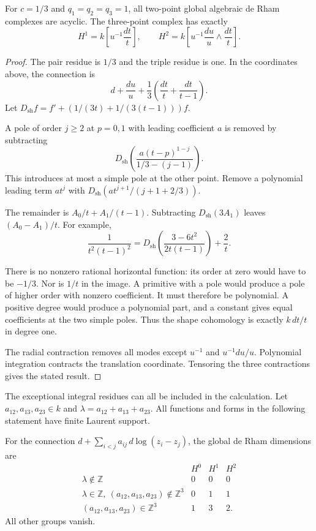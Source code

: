 \begin{proposition}\label{v4-arith:centers:prop:thirds}
For $c=1/3$ and $q_1=q_2=q_3=1$, all two-point
global algebraic de Rham complexes are acyclic.
The three-point complex has exactly
\[
 H^1=k\left[u^{-1}\frac{dt}{t}\right],\qquad
 H^2=k\left[u^{-1}\frac{du}{u}\wedge\frac{dt}{t}\right].
\]
\end{proposition}

\begin{proof}
The pair residue is $1/3$ and the triple residue
is one. In the coordinates above, the connection
is
\[
 d+\frac{du}{u}
 +\frac13\left(\frac{dt}{t}+\frac{dt}{t-1}\right).
\]
Let
$D_{\mathrm{sh}}f=f'+(1/(3t)+1/(3(t-1)))f$.

A pole of order $j\geq2$ at $p=0,1$ with
leading coefficient $a$ is removed by
subtracting
\[
 D_{\mathrm{sh}}\left(
 \frac{a(t-p)^{1-j}}{1/3-(j-1)}\right).
\]
This introduces at most a simple pole at the
other point. Remove a polynomial leading
term $at^j$ with
$D_{\mathrm{sh}}(at^{j+1}/(j+1+2/3))$.

The remainder is $A_0/t+A_1/(t-1)$.
Subtracting $D_{\mathrm{sh}}(3A_1)$ leaves
$(A_0-A_1)/t$. For example,
\begin{equation}\label{v4-arith:centers:eq:shape-identity}
 \frac1{t^2(t-1)^2}
 =
 D_{\mathrm{sh}}\left(\frac{3-6t^2}{2t(t-1)}\right)
 +\frac2t.
\end{equation}

There is no nonzero rational horizontal function:
its order at zero would have to be $-1/3$.
Nor is $1/t$ in the image. A primitive with
a pole would produce a pole of higher order
with nonzero coefficient. It must therefore
be polynomial. A positive degree would produce
a polynomial part, and a constant gives equal
coefficients at the two simple poles.
Thus the shape cohomology is exactly
$k\,dt/t$ in degree one.

The radial contraction removes all modes
except $u^{-1}$ and $u^{-1}du/u$.
Polynomial integration contracts the
translation coordinate. Tensoring the
three contractions gives the stated result.
\end{proof}

The exceptional integral residues can all be
included in the calculation. Let
$a_{12},a_{13},a_{23}\in k$ and
$\lambda=a_{12}+a_{13}+a_{23}$. All functions
and forms in the following statement have
finite Laurent support.

\begin{proposition}\label{v4-arith:centers:prop:residue-strata}
For the connection
$d+\sum_{i<j}a_{ij}\,d\log(z_i-z_j)$, the
global de Rham dimensions are
\[
\begin{array}{c|ccc}
 &H^0&H^1&H^2\\\hline
 \lambda\notin\mathbb Z&0&0&0\\
 \lambda\in\mathbb Z,\ (a_{12},a_{13},a_{23})
                  \notin\mathbb Z^3&0&1&1\\
 (a_{12},a_{13},a_{23})\in\mathbb Z^3&1&3&2.
\end{array}
\]
All other groups vanish.
\end{proposition}

